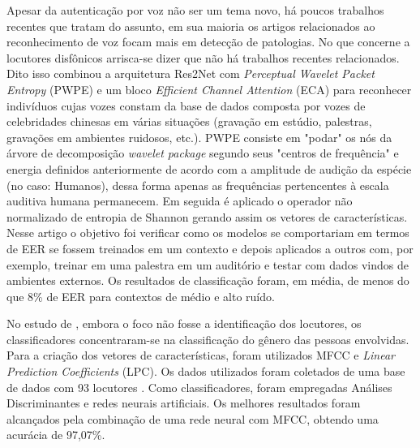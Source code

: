 			\par Apesar da autenticação por voz não ser um tema novo, há poucos trabalhos recentes que tratam do assunto, em sua maioria os artigos relacionados ao reconhecimento de voz focam mais em detecção de patologias. No que concerne a locutores disfônicos arrisca-se dizer que não há trabalhos recentes relacionados. Dito isso \cite{math11194205} combinou a arquitetura Res2Net \cite{gao2019res2net} com \textit{Perceptual Wavelet Packet Entropy} (PWPE) e um bloco \textit{Efficient Channel Attention} (ECA) \cite{DBLP:journals/corr/abs-1910-03151} para reconhecer indivíduos cujas vozes constam da base de dados \cite{fan2020cn} composta por vozes de celebridades chinesas em várias situações (gravação em estúdio, palestras, gravações em ambientes ruidosos, etc.). PWPE consiste em "podar" os nós da árvore de decomposição \textit{wavelet package} segundo seus "centros de frequência" e energia definidos anteriormente de acordo com a amplitude de audição da espécie (no caso: Humanos), dessa forma apenas as frequências pertencentes à escala auditiva humana permanecem. Em seguida é aplicado o operador não normalizado de entropia de Shannon gerando assim os vetores de características. Nesse artigo o objetivo foi verificar como os modelos se comportariam em termos de EER se fossem treinados em um contexto e depois aplicados a outros com, por exemplo, treinar em uma palestra em um auditório e testar com dados vindos de ambientes externos. Os resultados de classificação foram, em média, de menos do que 8\% de EER para contextos de médio e alto ruído.
			
			\par No estudo de \cite{ali2022speech}, embora o foco não fosse a identificação dos locutores, os classificadores concentraram-se na classificação do gênero das pessoas envolvidas. Para a criação dos vetores de características, foram utilizados MFCC e \textit{Linear Prediction Coefficients} (LPC). Os dados utilizados foram coletados de uma base de dados com 93 locutores \cite{10.1121/1.411872}. Como classificadores, foram empregadas Análises Discriminantes e redes neurais artificiais. Os melhores resultados foram alcançados pela combinação de uma rede neural com MFCC, obtendo uma acurácia de 97,07\%.
			

